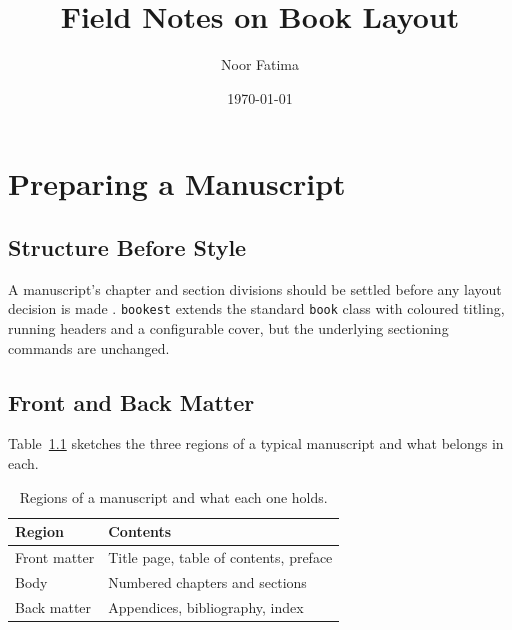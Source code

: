 \documentclass[11pt]{bookest}
\title{Field Notes on Book Layout}
\author{Noor Fatima}
\date{\today}
\begin{document}
\pagestyle{empty}
\maketitle
\clearpage
\pagestyle{headings}

\tableofcontents

\chapter{Preparing a Manuscript}

\section{Structure Before Style}

A manuscript's chapter and section divisions should be settled before any
layout decision is made \citep{knuth1984texbook}. \texttt{bookest} extends
the standard \texttt{book} class with coloured titling, running headers and a
configurable cover, but the underlying sectioning commands are unchanged.

\section{Front and Back Matter}

Table~\ref{tab:matter} sketches the three regions of a typical manuscript and
what belongs in each.

\begin{table}[h]
  \centering
  \begin{tabular}{lp{7cm}}
    \toprule
    Region & Contents \\
    \midrule
    Front matter & Title page, table of contents, preface \\
    Body & Numbered chapters and sections \\
    Back matter & Appendices, bibliography, index \\
    \bottomrule
  \end{tabular}
  \caption{Regions of a manuscript and what each one holds.}
  \label{tab:matter}
\end{table}
\end{document}
